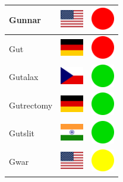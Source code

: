 \documentclass[12pt, a4paper, twoside]{report}
\begin{document}
\begin{center}
\begin{longtable}{|p{5cm}|p{2cm}|p{2cm}|}
 Gunnar                                                     & \includegraphics[width=1cm]{../4x3/us} &   \includegraphics[width=1cm]{../likes/n} \\ \hline
 Gut                                                        & \includegraphics[width=1cm]{../4x3/de} &   \includegraphics[width=1cm]{../likes/n} \\ \hline
 Gutalax                                                    & \includegraphics[width=1cm]{../4x3/cz} &   \includegraphics[width=1cm]{../likes/y} \\ \hline
 Gutrectomy                                                 & \includegraphics[width=1cm]{../4x3/de} &   \includegraphics[width=1cm]{../likes/y} \\ \hline
 Gutslit                                                    & \includegraphics[width=1cm]{../4x3/in} &   \includegraphics[width=1cm]{../likes/y} \\ \hline
 Gwar                                                       & \includegraphics[width=1cm]{../4x3/us} &   \includegraphics[width=1cm]{../likes/m} \\ \hline

\end{longtable}
\end{center}
\end{document}
